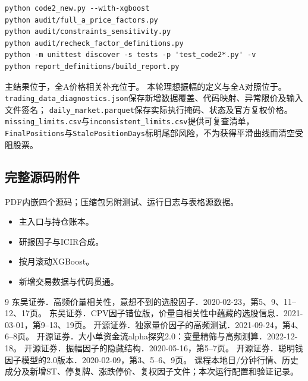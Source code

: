 \documentclass[UTF8,zihao=-4,fontset=fandol]{ctexart}
\begin{document}
\begin{Verbatim}[fontsize=\small,frame=single,breaklines=true]
python code2_new.py --with-xgboost
python audit/full_a_price_factors.py
python audit/constraints_sensitivity.py
python audit/recheck_factor_definitions.py
python -m unittest discover -s tests -p 'test_code2*.py' -v
python report_definitions/build_report.py
\end{Verbatim}
主结果位于，全A价格相关补充位于。
本轮理想振幅的定义与全A对照位于。
\texttt{trading\_data\_diagnostics.json}保存新增数据覆盖、代码映射、异常限价及输入文件签名；
\texttt{daily\_market.parquet}保存实际执行掩码、状态及官方复权价格。
\texttt{missing\_limits.csv}与\texttt{inconsistent\_limits.csv}提供可复查清单，
\texttt{FinalPositions}与\texttt{StalePositionDays}标明尾部风险，不为获得平滑曲线而清空受阻股票。

\subsection*{完整源码附件}
PDF内嵌四个源码；压缩包另附测试、运行日志与表格源数据。
\begin{itemize}
\item {}\quad 主入口与持仓账本。
\item {}\quad 研报因子与ICIR合成。
\item {}\quad 按月滚动XGBoost。
\item {}\quad 新增交易数据与代码贯通。
\end{itemize}

\begin{thebibliography}{9}\footnotesize
\setlength{\itemsep}{1pt}\setlength{\parskip}{0pt}\linespread{1.05}\selectfont
{} 东吴证券．高频价量相关性，意想不到的选股因子．2020-02-23，第5、9、11--12、17页。
 东吴证券．CPV因子错位版，价量自相关性中蕴藏的选股信息．2021-03-01，第9--13、19页。
 开源证券．独家量价因子的高频测试．2021-09-24，第4、6--8页。
 开源证券．大小单资金流alpha探究2.0：变量精筛与高频测算．2022-12-18。
 开源证券．振幅因子的隐藏结构．2020-05-16，第5--7页。
 开源证券．聪明钱因子模型的2.0版本．2020-02-09，第3、5--6、9页。
 课程本地日/分钟行情、历史成分及新增ST、停复牌、涨跌停价、复权因子文件；本次运行配置和验证记录。
\end{thebibliography}

\appendix

\end{document}
